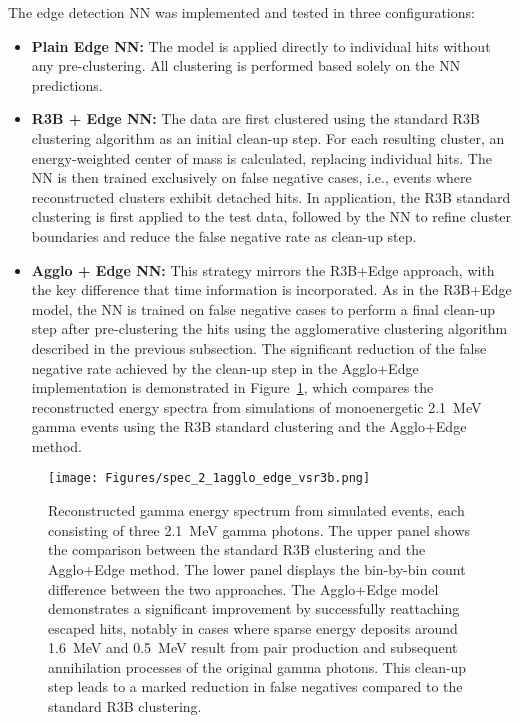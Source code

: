 The edge detection NN was implemented and tested in three configurations:
\begin{itemize}
    \item \textbf{Plain Edge NN:} The model is applied directly to individual hits without any pre-clustering. All clustering is performed based solely on the NN predictions.
    \item \textbf{R3B + Edge NN:} The data are first clustered using the standard R3B clustering algorithm as an initial clean-up step. For each resulting cluster, an energy-weighted center of mass is calculated, replacing individual hits. The  NN is then trained exclusively on false negative cases, i.e., events where reconstructed clusters exhibit detached hits. In application, the R3B standard clustering is first applied to the test data, followed by the NN to refine cluster boundaries and reduce the false negative rate as clean-up step.
    \item \textbf{Agglo + Edge NN:} This strategy mirrors the R3B+Edge approach, with the key difference that time information is incorporated. As in the R3B+Edge model, the NN is trained on false negative cases to perform a final clean-up step after pre-clustering the hits using the agglomerative clustering algorithm described in the previous subsection. The significant reduction of the false negative rate achieved by the clean-up step in the Agglo+Edge implementation is demonstrated in Figure~\ref{fig:2_1_mev_r3b_aggloNN}, which compares the reconstructed energy spectra from simulations of monoenergetic 2.1~MeV gamma events using the R3B standard clustering and the Agglo+Edge method.
\end{itemize}
\begin{figure}[!htb]
        \centering
        \texttt{[image: Figures/spec\_2\_1agglo\_edge\_vsr3b.png]}
        \caption{Reconstructed gamma energy spectrum from simulated events, each consisting of three 2.1~MeV gamma photons. The upper panel shows the comparison between the standard R3B clustering and the Agglo+Edge method. The lower panel displays the bin-by-bin count difference between the two approaches. The Agglo+Edge model demonstrates a significant improvement by successfully reattaching escaped hits, notably in cases where sparse energy deposits around 1.6~MeV and 0.5~MeV result from pair production and subsequent annihilation processes of the original gamma photons. This clean-up step leads to a marked reduction in false negatives compared to the standard R3B clustering.}
        \label{fig:2_1_mev_r3b_aggloNN}%
\end{figure}

